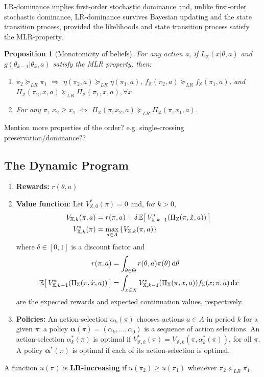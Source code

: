 \documentclass[11pt,onecolumn]{article}
\theoremstyle{plain}
\newtheorem{proposition}{Proposition}[section]
\newcommand{\ev}[1]{\hspace{+0.20ex}\mathbb{E}\hspace{-0.40ex}\left[ \, #1 \, \right]}
\newcommand{\iX}[0]{{\mathbb{X}}}
\newcommand\dif{\mathop{}\!\mathrm{d}}
\begin{document}
LR-dominance implies first-order stochastic dominance and, unlike first-order stochastic dominance, LR-dominance survives Bayesian updating and the state transition process, provided the likelihoods and state transition process satisfy the MLR-property.

\begin{proposition}[Monotonicity of beliefs]\label{prop:monotone_beliefs} For any action $a$, if $L_\iX(x|\theta,a)$ and $g(\theta_{k-1}|\theta_k,a)$ satisfy the MLR property, then:
    \begin{enumerate}
    \item $\pi_2 \succeq_{LR} \pi_1$ $\Rightarrow$ $\eta(\pi_2,a) \succeq_{LR} \eta(\pi_1,a)$, $f_\iX(\pi_2,a) \succeq_{LR} f_\iX(\pi_1,a)$, and $\Pi_\iX(\pi_2, x, a) \succeq_{LR} \Pi_\iX(\pi_1, x, a), \forall x$.
    \item For any $\pi$, $x_2 \geq x_1$ $\Leftrightarrow$ $\Pi_\iX(\pi,x_2,a) \succeq_{LR} \Pi_\iX(\pi,x_1,a)$.
    \end{enumerate}
\end{proposition}

Mention more properties of the order? e.g. single-crossing preservation/dominance??

\subsection{The Dynamic Program}
\begin{enumerate}
    \item \textbf{Rewards:} $r(\theta, a)$
    \item \textbf{Value function}: Let $V_{\iX,0}^*(\pi) = 0$ and, for $k> 0$,
    \begin{align}
    V_{\iX,k}(\pi,a) &= r(\pi,a) +  \delta \ev{V_{\iX,k-1}^*(\Pi_\iX(\pi,\tilde{x},a))}  \\
    V_{\iX,k}^*(\pi) &= \max_{a\in A} \left\{ V_{\iX,k}(\pi,a) \right\}
    \end{align}
    where $\delta \in [0,1]$ is a discount factor and
    \begin{align}
    r(\pi,a) &= \int_{\theta \in \Theta} r(\theta,a) \pi(\theta) \dif \theta \\
     \ev{V_{\iX,k-1}^*(\Pi_\iX(\pi,\tilde{x},a))}  &= \int_{x\in X} V_{\iX,k-1}^*(\Pi_\iX(\pi,x,a))f_\iX(x; \pi, a) \dif x
    \end{align}
    are the expected rewards and expected continuation values, respectively.
    \item \textbf{Policies:} An action-selection $\alpha_{k}(\pi)$ chooses actions $a \in A$ in period $k$ for a given $\pi$; a policy $\boldsymbol{\alpha}(\pi) = (\alpha_{k}, \ldots, \alpha_{0})$ is a sequence of action selections. An action-selection $\alpha_{k}^*(\pi)$ is optimal if $V_{\iX,k}^*(\pi) = V_{\iX,k}(\pi,\alpha_{k}^*(\pi))$, for all $\pi$.
    A policy $\boldsymbol{\alpha}^*(\pi)$ is optimal if each of its action-selection is optimal.
\end{enumerate}
A function $u(\pi)$ is \textbf{LR-increasing} if $u(\pi_2) \geq u(\pi_1)$ whenever $\pi_2 \succeq_{LR} \pi_1$.
\end{document}
